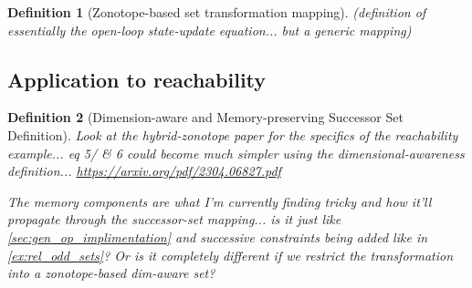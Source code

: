 \documentclass[11pt]{article}
\newtheorem{definition}{Definition}
\begin{document}
\begin{definition}[Zonotope-based set transformation mapping]
	(definition of essentially the open-loop state-update equation... but a generic mapping)
\end{definition}


\subsection{Application to reachability}

\begin{definition}[Dimension-aware and Memory-preserving Successor Set Definition]
	Look at the hybrid-zonotope paper for the specifics of the reachability example... 
	eq 5/ \& 6 could become much simpler using the dimensional-awareness definition... 
	\url{https://arxiv.org/pdf/2304.06827.pdf}

	The memory components are what I'm currently finding tricky and how it'll propagate through the successor-set mapping... 
	is it just like \autoref{sec:gen_op_implimentation} and successive constraints being added like in \autoref{ex:rel_odd_sets}?
	Or is it completely different if we restrict the transformation into a zonotope-based dim-aware set?
\end{definition}
\end{document}
